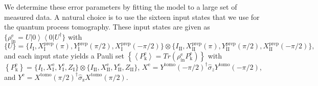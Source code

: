 We determine these error parameters by fitting the model to a large set of measured data. A natural choice is to use the sixteen input states that we use for the quantum process tomography. These input states are given as $\{ \rho_{\mathrm{in}}^{\mathrm{e}}=U\left|0\right\rangle \left\langle 0\right|U^{\dagger}\} $
with 
%
\begin{equation}
\{ U\} =\{I_{\mathrm{I}}, X_{\mathrm{I}}^{\mathrm{prep}}(\pi), Y_{\mathrm{I}}^{\mathrm{prep}}(\pi/2),X_{\mathrm{I}}^{\mathrm{prep}}(-\pi/2)\}\otimes\{I_{\mathrm{II}},X_{\mathrm{II}}^{\mathrm{prep}}(\pi),Y_{\mathrm{II}}^{\mathrm{prep}}(\pi/2),X_{\mathrm{II}}^{\mathrm{prep}}(-\pi/2)\},
\end{equation}
%
and each input state yields a Pauli set $\left\{ \left\langle P_{\mathrm{k}}^{\mathrm{e}}\right\rangle =Tr\left(\rho_{\mathrm{in}}^{\mathrm{e}}P_{\mathrm{k}}^{\mathrm{e}}\right)\right\} $
with $\left\{ P_{\mathrm{k}}^{\mathrm{e}}\right\} =\{I_{\mathrm{I}},X_{\mathrm{I}}^{\mathrm{e}},Y_{\mathrm{I}}^{\mathrm{e}},Z_{\mathrm{I}}\}\otimes\{I_{\mathrm{II}},X_{\mathrm{II}}^{\mathrm{e}},Y_{\mathrm{II}}^{\mathrm{e}},Z_{\mathrm{II}}\}$,
$X^{\mathrm{e}}=Y^{\mathrm{tomo}}(-\pi/2)^{\dagger}\hat{\sigma}_{z}Y^{\mathrm{tomo}}(-\pi/2)$,
and $Y^{\mathrm{e}}=X^{\mathrm{tomo}}(\pi/2)^{\dagger}\hat{\sigma}_{\mathrm{z}}X^{\mathrm{tomo}}(\pi/2)$.

